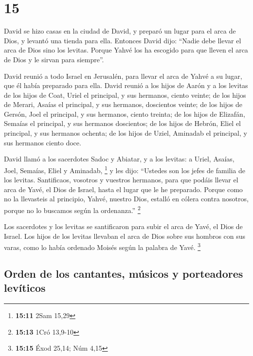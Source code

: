 \hypertarget{section-14}{%
\section{15}\label{section-14}}

 David se hizo casas en la ciudad de David, y preparó un
lugar para el arca de Dios, y levantó una tienda para ella.
 Entonces David dijo: ``Nadie debe llevar el arca de Dios
sino los levitas. Porque Yahvé los ha escogido para que lleven el arca
de Dios y le sirvan para siempre''.

 David reunió a todo Israel en Jerusalén, para llevar el
arca de Yahvé a su lugar, que él había preparado para ella.
 David reunió a los hijos de Aarón y a los levitas
 de los hijos de Coat, Uriel el principal, y sus hermanos,
ciento veinte;  de los hijos de Merari, Asaías el
principal, y sus hermanos, doscientos veinte;  de los
hijos de Gersón, Joel el principal, y sus hermanos, ciento treinta;
 de los hijos de Elizafán, Semaías el principal, y sus
hermanos doscientos;  de los hijos de Hebrón, Eliel el
principal, y sus hermanos ochenta;  de los hijos de
Uziel, Aminadab el principal, y sus hermanos ciento doce.

 David llamó a los sacerdotes Sadoc y Abiatar, y a los
levitas: a Uriel, Asaías, Joel, Semaías, Eliel y Aminadab, \footnote{\textbf{15:11}
  2Sam 15,29}  y les dijo: ``Ustedes son los jefes de
familia de los levitas. Santificaos, vosotros y vuestros hermanos, para
que podáis llevar el arca de Yavé, el Dios de Israel, hasta el lugar que
le he preparado.  Porque como no la llevasteis al
principio, Yahvé, nuestro Dios, estalló en cólera contra nosotros,
porque no lo buscamos según la ordenanza.'' \footnote{\textbf{15:13}
  1Cró 13,9-10}

 Los sacerdotes y los levitas se santificaron para subir
el arca de Yavé, el Dios de Israel.  Los hijos de los
levitas llevaban el arca de Dios sobre sus hombros con sus varas, como
lo había ordenado Moisés según la palabra de Yavé. \footnote{\textbf{15:15}
  Éxod 25,14; Núm 4,15}

\hypertarget{orden-de-los-cantantes-muxfasicos-y-porteadores-levuxedticos}{%
\subsection{Orden de los cantantes, músicos y porteadores
levíticos}\label{orden-de-los-cantantes-muxfasicos-y-porteadores-levuxedticos}}

